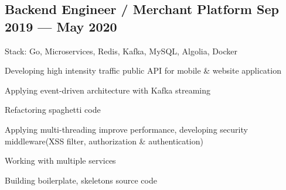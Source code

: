\documentclass[letter,10pt]{article}
\begin{document}
\subsection{{Backend Engineer / Merchant Platform \hfill Sep 2019 --- May 2020}}
\begin{zitemize}
\item Stack: Go, Microservices, Redis, Kafka, MySQL, Algolia, Docker
\item Developing high intensity traffic public API for mobile \& website application
\item Applying event-driven architecture with Kafka streaming
\item Refactoring spaghetti code 
\item Applying multi-threading improve performance, developing security middleware(XSS filter, authorization & authentication)
\item Working with multiple services
\item Building boilerplate, skeletons source code
\end{zitemize}

\end{document}
